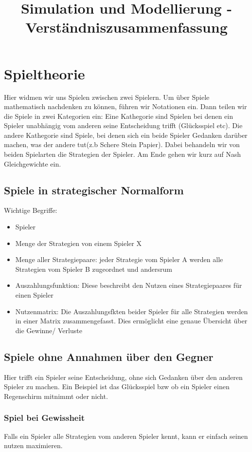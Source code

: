 \documentclass[]{article}
\title{Simulation und Modellierung - Verständniszusammenfassung}
\author{}
\title{}
\author{}
\begin{document}
\maketitle

\section{Spieltheorie}
Hier widmen wir uns Spielen zwischen zwei Spielern. Um über Spiele mathematisch nachdenken zu können, führen wir Notationen ein. Dann teilen wir die Spiele in zwei Kategorien ein: Eine Kathegorie sind Spielen bei denen ein Spieler unabhängig vom anderen seine Entscheidung trifft (Glücksspiel etc). Die andere Kathegorie sind Spiele, bei denen sich ein beide Spieler Gedanken darüber machen, was der andere tut(z.b Schere Stein Papier). Dabei behandeln wir von beiden Spielarten die Strategien der Spieler. Am Ende gehen wir kurz auf Nash Gleichgewichte ein. 

\subsection{Spiele in strategischer Normalform}
Wichtige Begriffe:
\begin{itemize}
	\item Spieler
	\item Menge der Strategien von einem Spieler X
	\item Menge aller Strategiepaare: jeder Strategie vom Spieler A werden alle Strategien vom Spieler B zugeordnet und andersrum
	\item Auszahlungsfunktion: Diese beschreibt den Nutzen eines Strategiepaares für einen Spieler
	\item Nutzenmatrix: Die Auszahlungsfkten beider Spieler für alle Strategien werden in einer Matrix zusammengefasst. Dies ermöglicht eine genaue Übersicht über die Gewinne/ Verluste  
\end{itemize}

\subsection{Spiele ohne Annahmen über den Gegner}
Hier trifft ein Spieler seine Entscheidung, ohne sich Gedanken über den anderen Spieler zu machen. Ein Beispiel ist das Glücksspiel bzw ob ein Spieler einen Regenschirm mitnimmt oder nicht. 

\subsubsection{Spiel bei Gewissheit}
Falls ein Spieler alle Strategien vom anderen Spieler kennt, kann er einfach seinen nutzen maximieren. 
\end{document}
